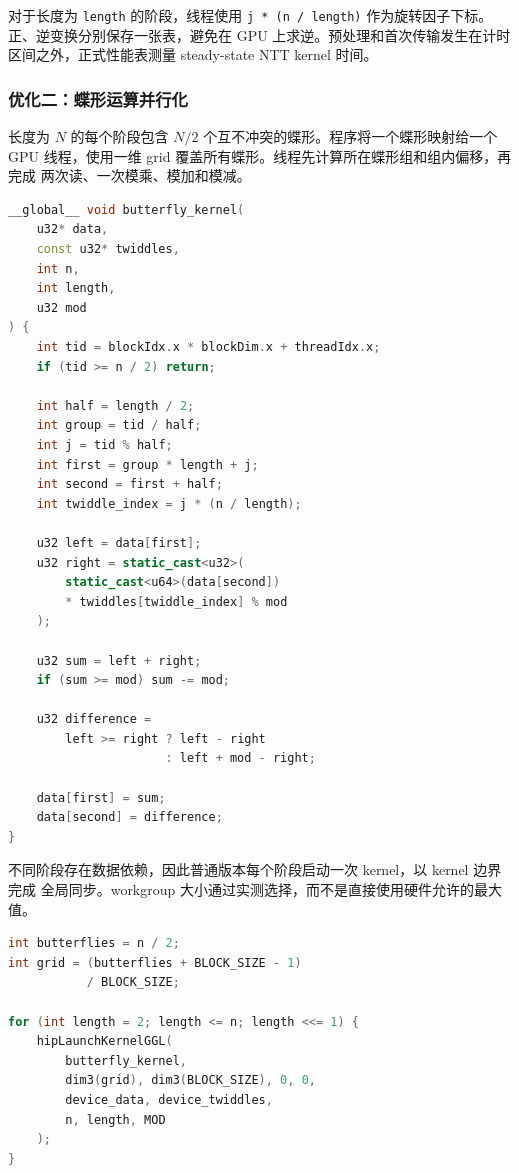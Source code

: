 ﻿\documentclass[a4paper]{article}
\begin{document}
对于长度为 \texttt{length} 的阶段，线程使用
\texttt{j * (n / length)} 作为旋转因子下标。正、逆变换分别保存一张表，避免在
GPU 上求逆。预处理和首次传输发生在计时区间之外，正式性能表测量 steady-state
NTT kernel 时间。

\subsubsection{优化二：蝶形运算并行化}

长度为 $N$ 的每个阶段包含 $N/2$ 个互不冲突的蝶形。程序将一个蝶形映射给一个
GPU 线程，使用一维 grid 覆盖所有蝶形。线程先计算所在蝶形组和组内偏移，再完成
两次读、一次模乘、模加和模减。

\begin{lstlisting}[language=C++,caption={一个线程负责一个蝶形运算}]
__global__ void butterfly_kernel(
    u32* data,
    const u32* twiddles,
    int n,
    int length,
    u32 mod
) {
    int tid = blockIdx.x * blockDim.x + threadIdx.x;
    if (tid >= n / 2) return;

    int half = length / 2;
    int group = tid / half;
    int j = tid % half;
    int first = group * length + j;
    int second = first + half;
    int twiddle_index = j * (n / length);

    u32 left = data[first];
    u32 right = static_cast<u32>(
        static_cast<u64>(data[second])
        * twiddles[twiddle_index] % mod
    );

    u32 sum = left + right;
    if (sum >= mod) sum -= mod;

    u32 difference =
        left >= right ? left - right
                      : left + mod - right;

    data[first] = sum;
    data[second] = difference;
}
\end{lstlisting}

不同阶段存在数据依赖，因此普通版本每个阶段启动一次 kernel，以 kernel 边界完成
全局同步。workgroup 大小通过实测选择，而不是直接使用硬件允许的最大值。

\begin{lstlisting}[language=C++,caption={逐阶段启动并行蝶形 kernel}]
int butterflies = n / 2;
int grid = (butterflies + BLOCK_SIZE - 1)
           / BLOCK_SIZE;

for (int length = 2; length <= n; length <<= 1) {
    hipLaunchKernelGGL(
        butterfly_kernel,
        dim3(grid), dim3(BLOCK_SIZE), 0, 0,
        device_data, device_twiddles,
        n, length, MOD
    );
}
\end{lstlisting}
\end{document}
